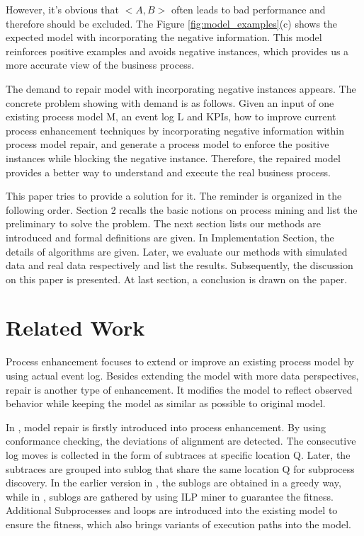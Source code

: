 \documentclass[]{article}
\begin{document}
However, it's obvious that $<A,B>$ often leads to bad performance and therefore should be excluded. The Figure \ref{fig:model_examples}(c) shows the expected model with incorporating the negative information. This model reinforces positive examples and avoids negative instances, which provides us a more accurate view of the business process.

The demand to repair model with incorporating negative instances appears. The concrete problem showing with demand is as follows. Given an input of one existing process model M, an event log L and KPIs, how  to improve current process enhancement techniques by incorporating negative information within process model repair, and generate a process model to enforce the positive instances while blocking the negative instance. Therefore, the repaired model provides a better way to understand and execute the real business process.


This paper tries to provide a solution for it. The reminder is organized in the following order. Section 2 recalls the basic notions on process mining and list the preliminary to solve the problem. The next section lists our methods are introduced and formal definitions are given. In Implementation Section, the details of algorithms are given. Later, we evaluate our methods with simulated data and real data respectively and list the results. Subsequently, the discussion on this paper is presented. At last section, a conclusion is drawn on the paper. 

\section{Related Work}
Process enhancement focuses to extend or improve an existing process model by using actual event log\cite{van2011process}. Besides extending the model with more data perspectives, repair is another type of enhancement. It modifies the model to reflect observed behavior while keeping the model as similar as possible to original model.

In \cite{fahland2012repairing}, model repair is firstly introduced into process enhancement. By using conformance checking, the deviations of alignment are detected. The consecutive log moves is collected in the form of subtraces at specific location Q. Later, the subtraces are grouped into sublog that share the same location Q for subprocess discovery. In the earlier version in \cite{fahland2012repairing}, the sublogs are obtained in a greedy way, while in \cite{fahland2015model}, sublogs are gathered by using ILP miner to guarantee the fitness. Additional Subprocesses and loops are introduced into the existing model to ensure the fitness, which also brings variants of execution paths into the model. 
\end{document}
